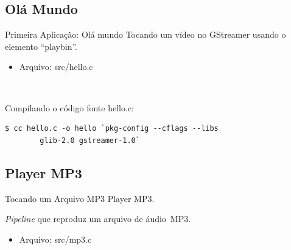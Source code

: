 \documentclass{beamer}
\def\en#1{\foreignlanguage{english}{\emph{#1}}}
\begin{document}
\subsection{Olá Mundo}

\begin{frame}[fragile]{Primeira Aplicação: Olá mundo}
  Tocando um vídeo no GStreamer usando o elemento ``playbin''.
  \begin{itemize}
    \item Arquivo: src/hello.c
  \end{itemize}
  ~

  Compilando o código fonte hello.c:
  \begin{lstlisting}[style=command]
  $ cc hello.c -o hello `pkg-config --cflags --libs
        glib-2.0 gstreamer-1.0`
  \end{lstlisting}
\end{frame}

\subsection{Player MP3}

\begin{frame}[c]{Tocando um Arquivo MP3}
  Player MP3.
  \begin{figure}[t]
    \centering
  \end{figure}
  \en{Pipeline} que reproduz um arquivo de áudio~MP3.
  ~
  \begin{itemize}
    \item Arquivo: src/mp3.c
  \end{itemize}
\end{frame}
\end{document}
